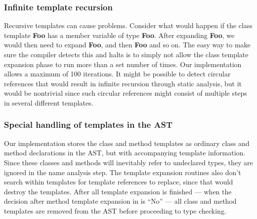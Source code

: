 \subsubsection{Infinite template recursion}

Recursive templates can cause problems. Consider what would happen if the class template
\textbf{Foo} has a member variable of type \textbf{Foo}. After expanding
\textbf{Foo}, we would then need to expand \textbf{Foo}, and then
\textbf{Foo} and so on. The easy way to make sure the compiler detects this and
halts is to simply not allow the class template expansion phase to run more than a set number of
times. Our implementation allows a maximum of 100 iterations. It might be possible to detect
circular references that would result in infinite recursion through static analysis, but it would be
nontrivial since such circular references might consist of multiple steps in several different
templates.

\subsubsection{Special handling of templates in the AST}

Our implementation stores the class and method templates as ordinary class and method declarations
in the AST, but with accompanying template information. Since these classes and methods will
inevitably refer to undeclared types, they are ignored in the name analysis step. The template
expansion routines also don't search within templates for template references to replace, since that
would destroy the templates. After all template expansion is finished --- when the decision after
method template expansion in  is ``No'' --- all class and method
templates are removed from the AST before proceeding to type checking.
